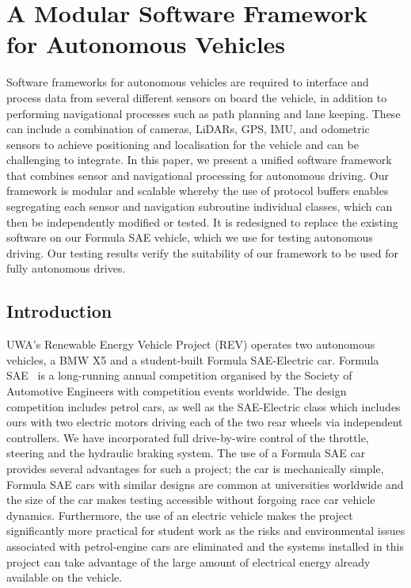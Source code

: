 
\chapter{A Modular Software Framework for Autonomous Vehicles}
\label{ch:modular}

\ifpdf
	\graphicspath{{Chapter6/Figs/Raster/}{Chapter6/Figs/PDF/}{Chapter6/Figs/}}
\else
	\graphicspath{{Chapter6/Figs/Vector/}{Chapter6/Figs/}}
\fi

Software frameworks for autonomous vehicles are required to interface and process data from several different sensors on board the vehicle, in addition to performing navigational processes such as path planning and lane keeping. These can include a combination of cameras, LiDARs, GPS, IMU, and odometric sensors to achieve positioning and localisation for the vehicle and can be challenging to integrate. In this paper, we present a unified software framework that combines sensor and navigational processing for autonomous driving. Our framework is modular and scalable whereby the use of protocol buffers enables segregating each sensor and navigation subroutine individual classes, which can then be independently modified or tested. It is redesigned to replace the existing software on our Formula SAE vehicle, which we use for testing autonomous driving. Our testing results verify the suitability of our framework to be used for fully autonomous drives.

\section{Introduction}
UWA's Renewable Energy Vehicle Project (REV) operates two autonomous vehicles, a BMW X5 and a student-built Formula SAE-Electric car. Formula SAE~\cite{sae_international_student_nodate} is a long-running annual competition organised by the Society of Automotive Engineers with competition events worldwide. The design competition includes petrol cars, as well as the SAE-Electric class which includes ours with two electric motors driving each of the two rear wheels via independent controllers. We have incorporated full drive-by-wire control of the throttle, steering and the hydraulic braking system. The use of a Formula SAE car provides several advantages for such a project; the car is mechanically simple, Formula SAE cars with similar designs are common at universities worldwide and the size of the car makes testing accessible without forgoing race car vehicle dynamics. Furthermore, the use of an electric vehicle makes the project significantly more practical for student work as the risks and environmental issues associated with petrol-engine cars are eliminated and the systems installed in this project can take advantage of the large amount of electrical energy already available on the vehicle.

